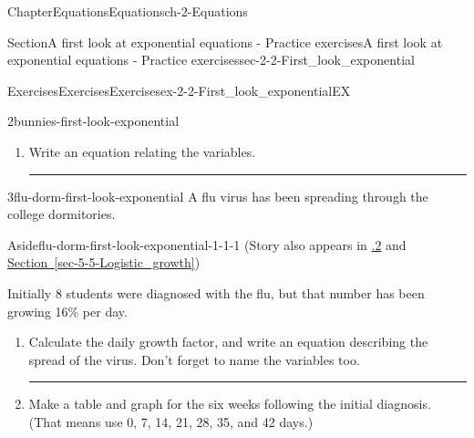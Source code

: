 \documentclass[twoside,11pt,]{book}
\newcommand{\xreffont}{\relax}
\newlength{\workspacestrutwidth}
\numberwithin{equation}{section}
\newcommand{\amp}{&}
\begin{document}
\begin{chapterptx}{Chapter}{Equations}{}{Equations}{}{}{ch-2-Equations}
\begin{sectionptx}{Section}{A first look at exponential equations - Practice exercises}{}{A first look at exponential equations - Practice exercises}{}{}{sec-2-2-First_look_exponential}
\begin{exercises-subsection-numberless}{Exercises}{Exercises}{}{Exercises}{}{}{ex-2-2-First_look_exponentialEX}
\begin{divisionexercise}{2}{}{}{bunnies-first-look-exponential}
\begin{enumerate}[label=(\alph*),ref=\alph*]
\item{}Write an equation relating the variables.%
\par\rule{\workspacestrutwidth}{1.5in}%
\end{enumerate}%
\end{divisionexercise}%
\clearpage
\begin{divisionexercise}{3}{}{}{flu-dorm-first-look-exponential}%
A flu virus has been spreading through the college dormitories. \begin{aside}{Aside}{}{flu-dorm-first-look-exponential-1-1-1}%
(Story also appears in \hyperlink{flu-dorm-modeling-exponential}{{\xreffont 5.1.2}} and \hyperref[sec-5-5-Logistic_growth]{Section~{\xreffont\ref{sec-5-5-Logistic_growth}}})%
\end{aside}
 Initially 8 students were diagnosed with the flu, but that number has been growing 16\% per day.%
\begin{enumerate}[label=(\alph*),ref=\alph*]%
\item{}Calculate the daily growth factor, and write an equation describing the spread of the virus. Don't forget to name the variables too.%
\par
    \hspace{-2cm}
%
%
\par\rule{\workspacestrutwidth}{0.75in}%
\item{}Make a table and graph for the six weeks following the initial diagnosis. (That means use 0, 7, 14, 21, 28, 35, and 42 days.)%

\end{enumerate}
\end{divisionexercise}
\end{exercises-subsection-numberless}
\end{sectionptx}
\end{chapterptx}
\end{document}
